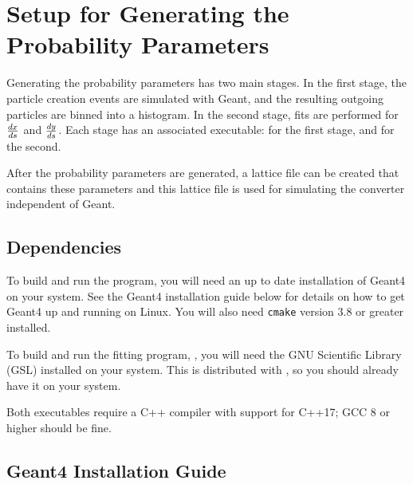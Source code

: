 \documentclass[12pt]{article}
\begin{document}

\section{Setup for Generating the Probability Parameters}

Generating the probability parameters has two main stages. In the first stage, the particle creation
events are simulated with Geant, and the resulting outgoing particles are binned into a
histogram. In the second stage, fits are performed for $\frac{dx}{ds}$ and $\frac{dy}{ds}$.  Each stage has an
associated executable: \exes for the first stage, and \exef for the second.

After the probability parameters are generated, a \bmad lattice file can be created that contains
these parameters and this lattice file is used for simulating the converter independent of Geant.

\subsection{Dependencies} 
\label{s:deps} 

To build and run the \exes program, you will need an up to date installation of Geant4 on
your system. See the Geant4 installation guide below for details on how to get Geant4 up and
running on Linux.  You will also need \texttt{cmake} version 3.8 or greater installed.

To build and run the fitting program, \exef, you will need the GNU Scientific Library (GSL)
installed on your system.  This is distributed with \bmad, so you should already have it on your
system.

Both executables require a C++ compiler with support for C++17; GCC 8 or higher should be fine.

\subsection{Geant4 Installation Guide}
\end{document}
